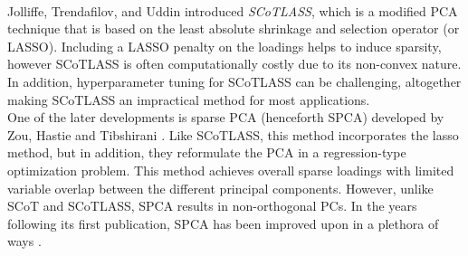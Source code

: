 \documentclass[12pt,letterpaper]{report}
\begin{document}
\\
Jolliffe, Trendafilov, and Uddin \citeyear{Jolliffe2003} introduced \textit{SCoTLASS}, which is a modified PCA technique that is based on the least absolute shrinkage and selection operator (or LASSO). Including a LASSO penalty on the loadings helps to induce sparsity, however SCoTLASS is often computationally costly due to its non-convex nature. In addition, hyperparameter tuning for SCoTLASS can be challenging, altogether making SCoTLASS an impractical method for most applications.\\

One of the later developments is sparse PCA (henceforth SPCA) developed by Zou, Hastie and Tibshirani \citeyear{Zou2006}. Like SCoTLASS, this method incorporates the lasso method, but in addition, they reformulate the PCA in a regression-type optimization problem. This method achieves overall sparse loadings with limited variable overlap between the different principal components. However, unlike SCoT and SCoTLASS, SPCA results in non-orthogonal PCs. In the years following its first publication, SPCA has been improved upon in a plethora of ways \cite{Shen2008, Journee2010}.

\\
\end{document}
